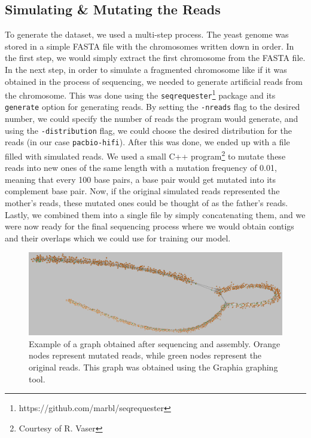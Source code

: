 \documentclass[times, utf8, diplomski, english]{fer_eng}
\begin{document}
\subsection{Simulating \& Mutating the Reads}

To generate the dataset, we used a multi-step process. The yeast genome was stored in a simple FASTA file with the chromosomes written down in order. In the first step, we would simply extract the first chromosome from the FASTA file. In the next step, in order to simulate a fragmented chromosome like if it was obtained in the process of sequencing, we needed to generate artificial reads from the chromosome. This was done using the \texttt{seqrequester}\footnote{https://github.com/marbl/seqrequester} package and its \texttt{generate} option for generating reads. By setting the \texttt{-nreads} flag to the desired number, we could specify the number of reads the program would generate, and using the \texttt{-distribution} flag, we could choose the desired distribution for the reads (in our case \texttt{pacbio-hifi}). After this was done, we ended up with a file filled with simulated reads. We used a small C++ program\footnote{Courtesy of R. Vaser} to mutate these reads into new ones of the same length with a mutation frequency of 0.01, meaning that every 100 base pairs, a base pair would get mutated into its complement base pair. Now, if the original simulated reads represented the mother's reads, these mutated ones could be thought of as the father's reads. Lastly, we combined them into a single file by simply concatenating them, and we were now ready for the final sequencing process where we would obtain contigs and their overlaps which we could use for training our model.

\begin{figure}[h]
	\centering
	\includegraphics[width=\textwidth]{images/graph_example.png}
	\caption[Graph]{Example of a graph obtained after sequencing and assembly. Orange nodes represent mutated reads, while green nodes represent the original reads. This graph was obtained using the Graphia\footnotemark{} graphing tool.}
	\label{fig:graph}
\end{figure}
\end{document}
